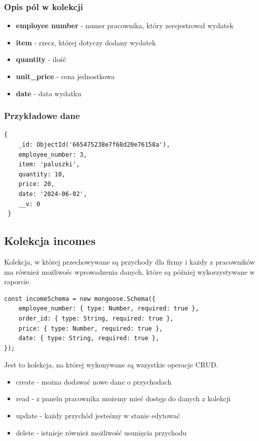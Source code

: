 \documentclass[12pt]{article}
\begin{document}
\subsubsection{Opis pól w kolekcji}

\begin{itemize}
	\item \textbf{employee number} - numer pracownika, który zerejestrował wydatek
	\item \textbf{item} - rzecz, której dotyczy dodany wydatek
	\item \textbf{quantity} - ilość 
	\item \textbf{unit\_price} - cena jednostkowa
	\item \textbf{date} - data wydatku
\end{itemize}

\subsubsection{Przykładowe dane}
\begin{lstlisting}[]
 {
    _id: ObjectId('665475238e7f68d20e76158a'),
    employee_number: 3,
    item: 'paluszki',
    quantity: 10,
    price: 20,
    date: '2024-06-02',
    __v: 0
 }
\end{lstlisting}

\newpage
\begin{samepage}
\subsection{Kolekcja incomes}
Kolekcja, w której przechowywane są przychody dla firmy i każdy z pracowników ma również możliwośc wprowadzenia danych, które są później wykorzystywane w raporcie.

\begin{lstlisting}[caption={Incomes}]
const incomeSchema = new mongoose.Schema({
    employee_number: { type: Number, required: true },
    order_id: { type: String, required: true },
    price: { type: Number, required: true },
    date: { type: String, required: true },
});
\end{lstlisting}
Jest to kolekcja, na której wykonywane są wszystkie operacje CRUD.
\begin{itemize}
	\item create - można dodawać nowe dane o przychodach 
	\item read - z panelu pracownika możemy mieć dostęp do danych z kolekcji
	\item update - każdy przychód jesteśmy w stanie edytować
	\item delete - istnieje również możliwość usunięcia przychodu
\end{itemize}
\end{samepage}
\end{document}
